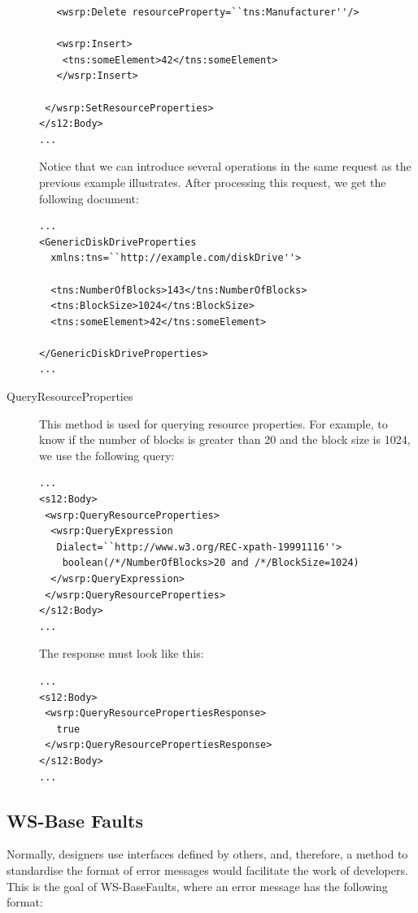 \begin{description}
\begin{lstlisting}
   <wsrp:Delete resourceProperty=``tns:Manufacturer''/>

   <wsrp:Insert>
    <tns:someElement>42</tns:someElement>
   </wsrp:Insert>

 </wsrp:SetResourceProperties>
</s12:Body>
...
\end{lstlisting}

Notice that we can introduce several operations in the same request as the previous example illustrates. 
After processing this request, we get the following document:

\begin{lstlisting}
...
<GenericDiskDriveProperties
  xmlns:tns=``http://example.com/diskDrive''>
  
  <tns:NumberOfBlocks>143</tns:NumberOfBlocks>
  <tns:BlockSize>1024</tns:BlockSize>
  <tns:someElement>42</tns:someElement>

</GenericDiskDriveProperties>
...
\end{lstlisting}

\item[QueryResourceProperties]
This method is used for querying resource properties. 
For example, to know if the number of blocks is greater than 20 and the block size is 1024,
we use the following query:

\begin{lstlisting}
...
<s12:Body>
 <wsrp:QueryResourceProperties>
  <wsrp:QueryExpression
   Dialect=``http://www.w3.org/REC-xpath-19991116''>
    boolean(/*/NumberOfBlocks>20 and /*/BlockSize=1024)
  </wsrp:QueryExpression>
 </wsrp:QueryResourceProperties>
</s12:Body>
...
\end{lstlisting}

The response must look like this:

\begin{lstlisting}
...
<s12:Body>
 <wsrp:QueryResourcePropertiesResponse>
   true
 </wsrp:QueryResourcePropertiesResponse>
</s12:Body>
...
\end{lstlisting}

\end{description}

\subsection{WS-Base Faults}
Normally, designers use interfaces defined by others, and, therefore,
a method to standardise the format of error messages would facilitate the work of developers. 
This is the goal of WS-BaseFaults, where an error message has the following format:

